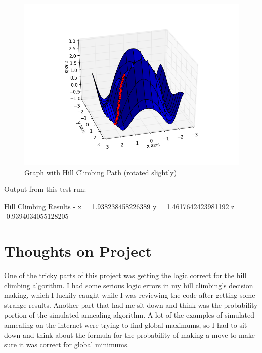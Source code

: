\documentclass{article}
\begin{document}
\begin{figure}[h!]
  \centering
  \includegraphics[scale=.5]{figure2.png}
  \caption{Graph with Hill Climbing Path (rotated slightly)}
\end{figure}

Output from this test run:

Hill Climbing Results - x =  1.938238458226389  y =  1.4617642423981192  z =  -0.9394034055128205

\section{Thoughts on Project}
One of the tricky parts of this project was getting the logic correct for the hill climbing algorithm. I had some serious logic errors in my hill climbing’s decision making, which I luckily caught while I was reviewing the code after getting some strange results. Another part that had me sit down and think was the probability portion of the simulated annealing algorithm. A lot of the examples of simulated annealing on the internet were trying to find global maximums, so I had to sit down and think about the formula for the probability of making a move to make sure it was correct for global minimums.
\end{document}
